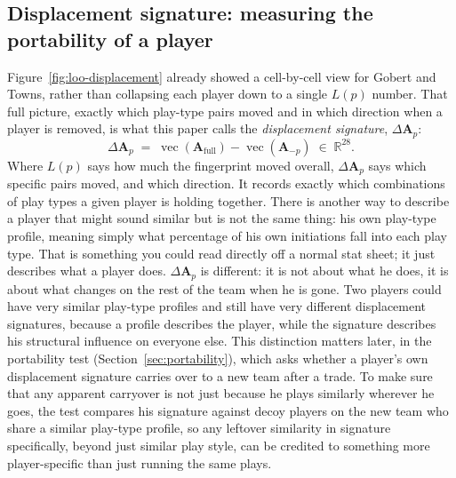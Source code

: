 \documentclass[11pt]{article}
\newcommand{\Amat}{\ensuremath{\bm{A}}} %
\newcommand{\Afull}{\ensuremath{\Amat_{\text{full}}}}
\newcommand{\Aminus}[1]{\ensuremath{\Amat_{-#1}}}
\newcommand{\load}{\ensuremath{L}} %
\newcommand{\dA}{\ensuremath{\Delta\Amat}} %
\begin{document}
\subsection{Displacement signature: measuring the portability of a player}
\label{sec:signature}

Figure~\ref{fig:loo-displacement} already showed a cell-by-cell view for Gobert and Towns,
rather than collapsing each player down to a single $\load(p)$ number. That full picture,
exactly which play-type pairs moved and in which direction when a player is removed, is what
this paper calls the \emph{displacement signature}, $\dA_p$:
\begin{equation}
\label{eq:signature}
\dA_p \;=\; \operatorname{vec}(\Afull)-\operatorname{vec}(\Aminus{p}) \;\in\;\mathbb{R}^{28}.
\end{equation}
Where $\load(p)$ says how much the fingerprint moved overall, $\dA_p$ says which specific
pairs moved, and which direction. It records exactly which combinations of play types a given
player is holding together.
There is another way to describe a player that might sound similar but is not the same thing:
his own play-type profile, meaning simply what percentage of his own initiations fall into
each play type. That is something you could read directly off a normal stat sheet; it just
describes what a player does. $\dA_p$ is different: it is not about what he does, it is about
what changes on the rest of the team when he is gone. Two players could have very similar
play-type profiles and still have very different displacement signatures, because a profile
describes the player, while the signature describes his structural influence on everyone else.
This distinction matters later, in the portability test (Section~\ref{sec:portability}), which
asks whether a player's own displacement signature carries over to a new team after a trade.
To make sure that any apparent carryover is not just because he plays similarly wherever he
goes, the test compares his signature against decoy players on the new team who share a
similar play-type profile, so any leftover similarity in signature specifically, beyond just
similar play style, can be credited to something more player-specific than just running the
same plays.
\end{document}
